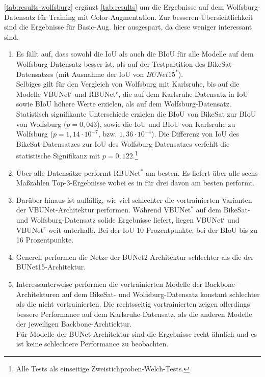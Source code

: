 \autoref{tab:results-wolfsburg} ergänzt \autoref{tab:results} um die Ergebnisse auf dem Wolfsburg-Datensatz für 
Training mit Color-Augmentation. Zur besseren Übersichtlichkeit sind die Ergebnisse für Basic-Aug. hier ausgespart, 
da diese weniger interessant sind. 
\begin{enumerate}
	\item Es fällt auf, dass sowohl die \ac{IoU} als auch die \ac{BIoU} für alle Modelle
	auf dem Wolfsburg-Datensatz besser ist, als auf der Testpartition des BikeSat-Datensatzes 
	(mit Ausnahme der IoU von $BUNet15^*$).  \\
	Selbiges gilt für den Vergleich von Wolfsburg mit Karlsruhe, bis auf die Modelle VBUNet$^l$ und 
	RBUNet$^r$, die auf dem Karlsruhe-Datensatz in IoU sowie BIoU höhere Werte erzielen, als auf dem Wolfsburg-Datensatz. \\
	Statistisch signifikante Unterschiede erzielen die BIoU von BikeSat zur BIoU von Wolfsburg ($p = 0,043$), 
	sowie die IoU und BIoU von Karlsruhe zu Wolfsburg ($p = 1,14 \cdot 10^{-7}$, bzw. $1,36 \cdot 10^{-4}$). 
	Die Differenz von IoU des BikeSat-Datensatzes zur IoU des Wolfsburg-Datensatzes verfehlt die statistische Signifikanz 
	mit $p = 0,122$.\footnote{Alle Tests als einseitige Zweistichproben-Welch-Tests.}  
	\item Über alle Datensätze performt RBUNet$^*$ am besten. Es liefert über alle sechs Maßzahlen Top-3-Ergebnisse wobei es 
	in für drei davon am besten performt. 
	\item Darüber hinaus ist auffällig, wie viel schlechter die vortrainierten Varianten der VBUNet-Architektur performen. 
	Während VBUNet$^*$ auf dem BikeSat- und Wolfsburg-Datensatz solide Ergebnisse liefert, liegen VBUNet$^l$ und VBUNet$^r$ 
	weit unterhalb. Bei der IoU 10 Prozentpunkte, bei der BIoU bis zu 16 Prozentpunkte.
	\item Generell performen die Netze der \ac{BUNet2}-Architektur schlechter als die der \ac{BUNet15}-Architektur.
	\item Interessanterweise performen die vortrainierten Modelle der Backbone-Architekturen auf dem BikeSat- und 
	Wolfsburg-Datensatz konstant schlechter als die nicht vortrainierten. Die rechtsseitig vortrainierten zeigen 
	allerdings bessere Performance auf dem Karlsruhe-Datensatz, als die anderen Modelle der jeweiligen Backbone-Archtiektur.\\
	Für Modelle der BUNet-Architektur sind die Ergebnisse recht ähnlich und es ist keine schlechtere Performance
	zu beobachten. 
\end{enumerate}


